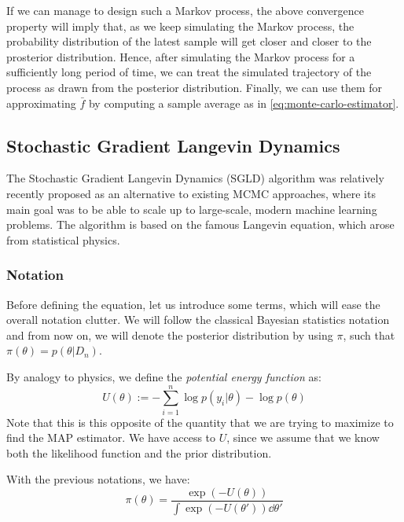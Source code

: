 \documentclass[toc, titlepaged]{../cs-classes/cs-classes}
\begin{document}
If we can manage to design such a Markov process, the above convergence property will imply that, as we keep simulating the Markov process, the probability distribution of the latest sample will get closer and closer to the prosterior distribution. Hence, after simulating the Markov process for a sufficiently long period of time, we can treat the simulated trajectory of the process as  drawn from the posterior distribution. Finally, we can use them for approximating $\bar{f}$ by computing a sample average as in \eqref{eq:monte-carlo-estimator}.

\subsection{Stochastic Gradient Langevin Dynamics}
The Stochastic Gradient Langevin Dynamics (SGLD) algorithm was relatively recently proposed as an alternative to existing MCMC approaches, where its main goal was to be able to scale up to large-scale, modern machine learning problems. The algorithm is based on the famous Langevin equation, which arose from statistical physics. 

\subsubsection{Notation}
Before defining the equation, let us introduce some terms, which will ease the overall notation clutter. We will follow the classical Bayesian statistics notation and from now on, we will denote the posterior distribution by using $\pi$, such that $\pi(\theta)=p(\theta|D_n)$.

\begin{definition}
    By analogy to physics, we define the \emph{potential energy function} as:
    \begin{equation}
        U(\theta) := - \sum_{i=1}^n \log p(y_i|\theta)-\log p(\theta)
    \end{equation}
    Note that this is this opposite of the quantity that we are trying to maximize to find the MAP estimator. We have access to $U$, since we assume that we know both the likelihood function and the prior distribution.
\end{definition}

\begin{property}
    With the previous notations, we have:
    \begin{equation}
        \pi(\theta) = \frac{\exp(-U(\theta))}{\int \exp\left(-U(\theta')\right)\dd\theta'}
    \end{equation}
\end{property}
\end{document}

